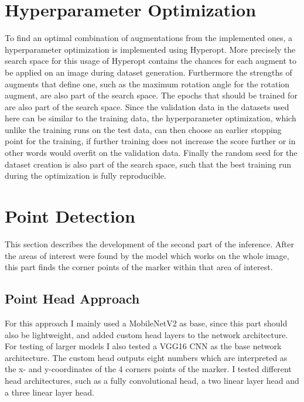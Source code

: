 \documentclass[10pt]{book}
\begin{document}
\section{Hyperparameter Optimization}
\label{sec:hyper_opt}

To find an optimal combination of augmentations from the implemented ones, a hyperparameter optimization is implemented using Hyperopt. More precisely the search space for this usage of Hyperopt contains the chances for each augment to be applied on an image during dataset generation. Furthermore the strengths of augments that define one, such as the maximum rotation angle for the rotation augment, are also part of the search space. The epochs that should be trained for are also part of the search space. Since the validation data in the datasets used here can be similar to the training data, the hyperparameter optimization, which unlike the training runs on the test data, can then choose an earlier stopping point for the training, if further training does not increase the score further or in other words would overfit on the validation data. Finally the random seed for the dataset creation is also part of the search space, such that the best training run during the optimization is fully reproducible.

\section{Point Detection}

This section describes the development of the second part of the inference. After the areas of interest were found by the model which works on the whole image, this part finds the corner points of the marker within that area of interest.

\subsection{Point Head Approach}

For this approach I mainly used a MobileNetV2 as base, since this part should also be lightweight, and added custom head layers to the network architecture. For testing of larger models I also tested a VGG16 \ac{CNN} as the base network architecture. The custom head outputs eight numbers which are interpreted as the x- and y-coordinates of the 4 corners points of the marker. I tested different head architectures, such as a fully convolutional head, a two linear layer head and a three linear layer head.
\end{document}
